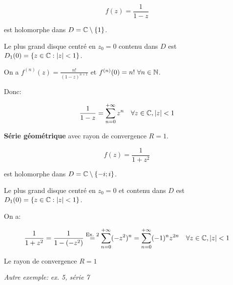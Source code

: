 \begin{example}[2]
    \[f(z) = \frac{1}{1-z}\]
    
     est holomorphe dans $D = \mathbb{C} \setminus \{1\}$.
    
    Le plus grand disque centré en $z_0 = 0$ contenu dans $D$ est $D_1(0) = \{ z \in \mathbb{C} : \left|z\right| < 1 \}$.
    
    On a $f^{(n)}(z) = \frac{n!}{(1-z)^{n+1}}$ et $f^{(n)}(0) = n! \ \forall n \in \mathbb{N}$.
    
    Donc:
    
    \[
    \frac{1}{1-z} = \sum_{n=0}^{+\infty} z^n \quad \forall z \in \mathbb{C}, \left|z\right| < 1
    \]
    
    \textbf{\og Série géométrique \fg{}} avec rayon de convergence $R = 1$.
\end{example}

\begin{example}[3]
    \[f(z) = \frac{1}{1 + z^2}\]
    
    est holomorphe dans $D = \mathbb{C} \setminus \{-i; i\}$.
    
    Le plus grand disque centré en $z_0 = 0$ et contenu dans $D$ est $D_1(0) = \{z \in \mathbb{C} : \left|z\right| < 1\}$.
    
    On a:
    
    \[
    \frac{1}{1 + z^2}
    = \frac{1}{1 - \left(-z^2\right)}
    \overset{\textrm{Ex. 2}}{=}
    \sum_{n=0}^{+\infty} (-z^2)^n
    = \sum_{n=0}^{+\infty} (-1)^n z^{2n} \quad \forall z \in \mathbb{C}, \left|z\right| < 1
    \]
    
    Le rayon de convergence $R = 1$
\end{example}

\textit{Autre exemple: ex. 5, série 7}






















